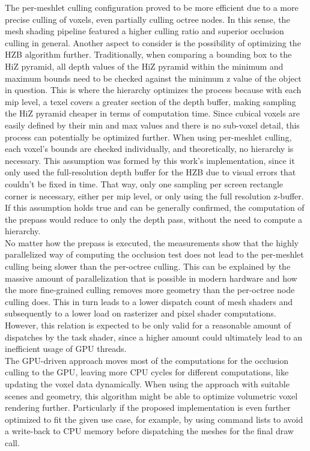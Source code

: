 \noindent
The per-meshlet culling configuration proved to be more efficient due to a more precise culling of voxels, even partially culling octree nodes.
In this sense, the mesh shading pipeline featured a higher culling ratio and superior occlusion culling in general. Another aspect to consider 
is the possibility of optimizing the \ac{HZB} algorithm further. Traditionally, when comparing a bounding box to the \ac{HiZ} pyramid, all depth 
values of the \ac{HiZ} pyramid within the minimum and maximum bounds need to be checked against the minimum z value of the object in question.
This is where the hierarchy optimizes the process because with each mip level, a texel covers a greater section of the depth buffer, making 
sampling the \ac{HiZ} pyramid cheaper in terms of computation time. Since cubical voxels are easily defined by their min and max values and 
there is no sub-voxel detail, this process can potentially be optimized further. When using per-meshlet culling, each voxel's bounds are 
checked individually, and theoretically, no hierarchy is necessary. This assumption was formed by this work's implementation, since it only used 
the full-resolution depth buffer for the \ac{HZB} due to visual errors that couldn't be fixed in time. That way, only one sampling per screen 
rectangle corner is necessary, either per mip level, or only using the full resolution z-buffer. If this assumption holds true and can be 
generally confirmed, the computation of the prepass would reduce to only the depth pass, without the need to compute a hierarchy. \\

\noindent
No matter how the prepass is executed, the measurements show that the highly parallelized way of computing the occlusion test does not lead to 
the per-meshlet culling being slower than the per-octree culling. This can be explained by the massive amount of parallelization that is 
possible in modern hardware and how the more fine-grained culling removes more geometry than the per-octree node culling does. This in turn leads 
to a lower dispatch count of mesh shaders and subsequently to a lower load on rasterizer and pixel shader computations. However, this relation 
is expected to be only valid for a reasonable amount of dispatches by the task shader, since a higher amount could ultimately lead to an inefficient 
usage of \ac{GPU} threads. \\

\noindent
The \ac{GPU}-driven approach moves most of the computations for the occlusion culling to the \ac{GPU}, leaving more \ac{CPU} cycles for different 
computations, like updating the voxel data dynamically. When using the approach with suitable scenes and geometry, this algorithm might be able 
to optimize volumetric voxel rendering further. Particularly if the proposed implementation is even further optimized to fit the given use case, 
for example, by using command lists to avoid a write-back to \ac{CPU} memory before dispatching the meshes for the final draw call. \\

